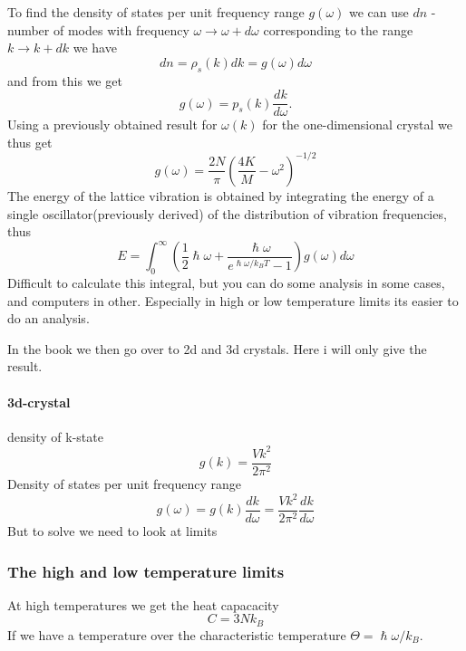 \documentclass[11pt]{article}
\begin{document}
To find the density of states per unit frequency range $g(\omega)$ we can use $dn$ - number of modes with frequency $\omega \to \omega + d \omega$ corresponding to the range $k \to k + dk$ we have
\begin{equation}
	dn = \rho_s(k) dk = g(\omega) d\omega
\end{equation}
and from this we get
\begin{equation}
	g(\omega) = p_s(k) \frac{dk}{d \omega}.
	\label{eq:states-freq}
\end{equation}
Using a previously obtained result for $\omega(k)$ for the one-dimensional crystal we thus get
\begin{equation}
	g(\omega) = \frac{2N}{\pi} (\frac{4K}{M} - \omega^2)^{-1/2}
\end{equation}
The energy of the lattice vibration is obtained by integrating the energy of a single oscillator(previously derived) of the distribution of vibration frequencies, thus
\begin{equation}
	E = \int^\infty_0 (\frac{1}{2} \hslash \omega + \frac{\hslash \omega}{e^{\hslash \omega/k_B T} - 1}) g(\omega ) d\omega
	\label{eq:vibration-energy}
\end{equation}
Difficult to calculate this integral, but you can do some analysis in some cases, and computers in other. Especially in high or low temperature limits its easier to do an analysis.

In the book we then go over to 2d and 3d crystals. Here i will only give the result.

\paragraph{3d-crystal}
density of k-state
\begin{equation}
	g(k) = \frac{Vk^2}{2\pi^2}
\end{equation}
Density of states per unit frequency range
\begin{equation}
	g(\omega) = g(k)\frac{dk}{d\omega} = \frac{Vk^2}{2\pi^2} \frac{dk}{d\omega}
\end{equation}
But to solve we need to look at limits
\subsubsection{The high and low temperature limits}
At high temperatures we get the heat capacacity
\begin{equation}
	C = 3Nk_B
\end{equation}
If we have a temperature over the characteristic temperature $\Theta = \hslash \omega/k_B$.
\end{document}
